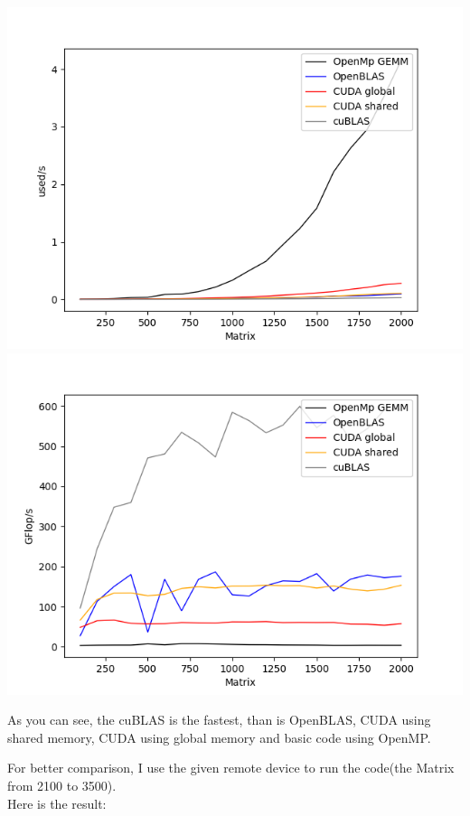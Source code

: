 \documentclass[12pt]{ctexart}
\begin{document}
\includegraphics[scale=0.5]{1s}
\includegraphics[scale=0.5]{1g}

As you can see, the cuBLAS is the fastest, than is OpenBLAS, CUDA using shared memory, CUDA using global memory and basic code using OpenMP.

For better comparison, I use the given remote device to run the code(the Matrix from 2100 to 3500).\\Here is the result:
\end{document}
